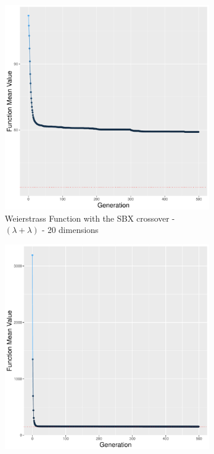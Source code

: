 \begin{figure}[!t]
	\begin{subfigure}[b]{0.24\textwidth}
		\centering
		\includegraphics[width=\textwidth]{img/covergency_multimodal_2n2n_16_dim_20_tsize_16.pdf}
		\caption{Weierstrass Function with the SBX crossover - $(\lambda + \lambda)$ - 20 dimensions}
	\end{subfigure}
	\begin{subfigure}[b]{0.24\textwidth}
		\includegraphics[width=\textwidth]{img/covergency_unimodal_sbx_8_dim_10_tsize_9.pdf}

\end{subfigure}
\end{figure}
